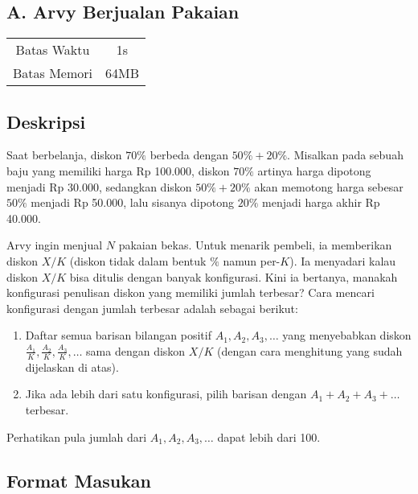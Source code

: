 \documentclass{article}
\begin{document}
\begin{center}
    \section*{A. Arvy Berjualan Pakaian} %

    \begin{tabular}{ | c c | }
        \hline
        Batas Waktu  & 1s \\    %
        Batas Memori & 64MB \\  %
        \hline
    \end{tabular}
\end{center}

\subsection*{Deskripsi}

Saat berbelanja, diskon $70\%$ berbeda dengan $50\% + 20\%$.
Misalkan pada sebuah baju yang memiliki harga Rp 100.000, diskon $70\%$ artinya harga dipotong menjadi Rp 30.000, sedangkan diskon $50\% + 20\%$ akan memotong harga sebesar $50\%$ menjadi Rp 50.000, lalu sisanya dipotong $20\%$ menjadi harga akhir Rp 40.000.

Arvy ingin menjual $N$ pakaian bekas.
Untuk menarik pembeli, ia memberikan diskon $X / K$ (diskon tidak dalam bentuk $\%$ namun per-$K$).
Ia menyadari kalau diskon $X / K$ bisa ditulis dengan banyak konfigurasi.
Kini ia bertanya, manakah konfigurasi penulisan diskon yang memiliki jumlah terbesar?
Cara mencari konfigurasi dengan jumlah terbesar adalah sebagai berikut:
\begin{enumerate}
    \item Daftar semua barisan bilangan positif $A_1, A_2, A_3, \dots$ yang menyebabkan diskon $\frac{A_1}{K}, \frac{A_2}{K}, \frac{A_3}{K} , \dots $ sama dengan diskon $X / K$ (dengan cara menghitung yang sudah dijelaskan di atas).
    \item Jika ada lebih dari satu konfigurasi, pilih barisan dengan $A_1 + A_2 + A_3 + \dots $ terbesar.
\end{enumerate}

Perhatikan pula jumlah dari $A_1, A_2, A_3, \dots$ dapat lebih dari 100.

\subsection*{Format Masukan}
\end{document}
